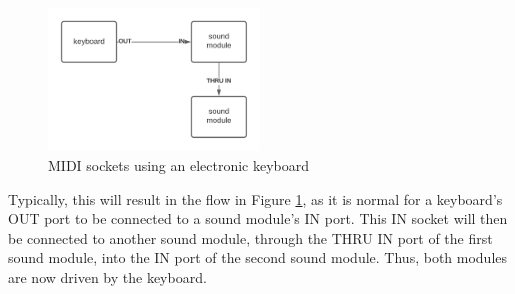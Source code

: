 \begin{figure}
	\centering
	\includegraphics[width=0.5\textwidth]{figures/midi-sockets.png}
	\caption{MIDI sockets using an electronic keyboard}
	\label{fig:midi-sockets}
\end{figure}

Typically, this will result in the flow in Figure \ref{fig:midi-sockets}, as it is normal for a keyboard's OUT port to be connected to a sound module's IN port. This IN socket will then be connected to another sound module, through the THRU IN port of the first sound module, into the IN port of the second sound module. Thus, both modules are now driven by the keyboard\cite{Kirk_Hunt_2013}.

